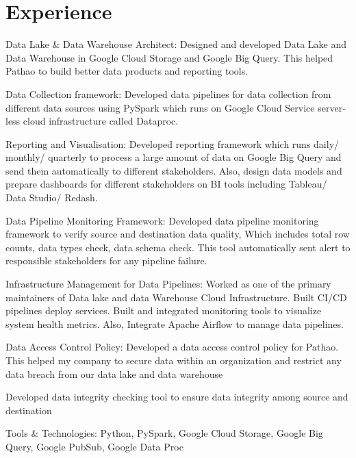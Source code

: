 \documentclass[letterpaper]{deedy-resume} %
\begin{document}
\hfill
%
%
\begin{minipage}[t]{0.66\textwidth} %


\section{Experience}


\vspace{\topsep} %
\begin{tightitemize}
\item Data Lake & Data Warehouse Architect:
Designed and developed Data Lake and Data Warehouse in Google Cloud Storage and Google Big Query. This helped Pathao to build better data products and reporting tools.
\item Data Collection framework:
Developed data pipelines for data collection from different data sources using PySpark which runs on Google Cloud Service server-less cloud infrastructure called Dataproc.
\item Reporting and Visualisation:
Developed reporting framework which runs daily/ monthly/ quarterly to process a large amount of data on Google Big Query and send them automatically to different stakeholders. Also, design data models and prepare dashboards for different stakeholders on BI tools including Tableau/ Data Studio/ Redash.
\item Data Pipeline Monitoring Framework:
Developed data pipeline monitoring framework to verify source and destination data quality, Which includes total row counts, data types check, data schema check. This tool automatically sent alert to responsible stakeholders for any pipeline failure.
\item Infrastructure Management for Data Pipelines:
Worked as one of the primary maintainers of Data lake and data Warehouse Cloud Infrastructure. Built CI/CD pipelines deploy services. Built and integrated monitoring tools to visualize system health metrics. Also, Integrate Apache Airflow to manage data pipelines.
\item Data Access Control Policy:
Developed a data access control policy for Pathao. This helped my company to secure data within an organization and restrict any data breach from our data lake and data warehouse
\item Developed data integrity checking tool to ensure data integrity among source and destination
\item Tools & Technologies: Python, PySpark, Google Cloud Storage, Google Big Query, Google PubSub, Google Data Proc
\end{tightitemize}


\end{minipage}
\end{document}
